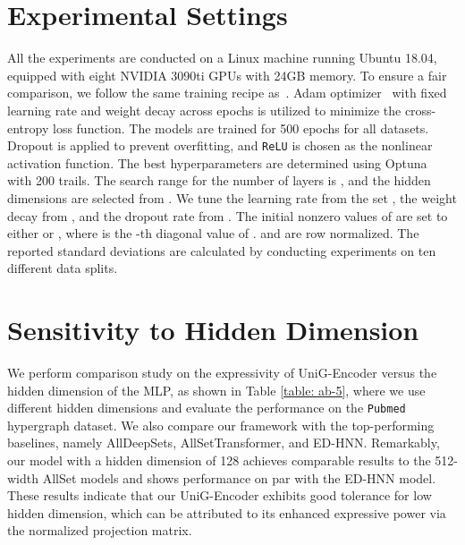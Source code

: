 \documentclass[review]{elsarticle}
\begin{document}
\section{Experimental Settings}

All the experiments are conducted on a Linux machine running Ubuntu 18.04, equipped with eight NVIDIA 3090ti GPUs with 24GB memory. To ensure a fair comparison, we follow the same training recipe as~\cite{wang2022equivariant,chien2021you}. Adam optimizer~\cite{kingma2014adam} with fixed learning rate and weight decay across epochs is utilized to minimize the cross-entropy loss function. The models are trained for 500 epochs for all datasets. Dropout is applied to prevent overfitting, and \texttt{ReLU} is chosen as the nonlinear activation function. The best hyperparameters are determined using Optuna~\cite{akiba2019optuna} with 200 trails. The search range for the number of layers is , and the hidden dimensions are selected from . We tune the learning rate from the set , the weight decay from , and the dropout rate from . The initial nonzero values of  are set to either  or , where  is the -th diagonal value of .  and  are row normalized. The reported standard deviations are calculated by conducting experiments on ten different data splits.

\section{Sensitivity to Hidden Dimension}

We perform comparison study on the expressivity of UniG-Encoder versus the hidden dimension of the MLP, as shown in Table \ref{table: ab-5}, where we use different hidden dimensions and evaluate the performance on the \texttt{Pubmed} hypergraph dataset. We also compare our framework with the top-performing baselines, namely AllDeepSets, AllSetTransformer, and ED-HNN. Remarkably, our model with a hidden dimension of 128 achieves comparable results to the 512-width AllSet models and shows performance on par with the ED-HNN model. These results indicate that our UniG-Encoder exhibits good tolerance for low hidden dimension, which can be attributed to its enhanced expressive power via the normalized projection matrix.

\begin{table}[htbp]
  \centering
  \caption{\textbf{Sensitivity to hidden dimension on \texttt{Pubmed} hypergraph dataset.}}
  \label{table: ab-5}
\end{table}
\end{document}
